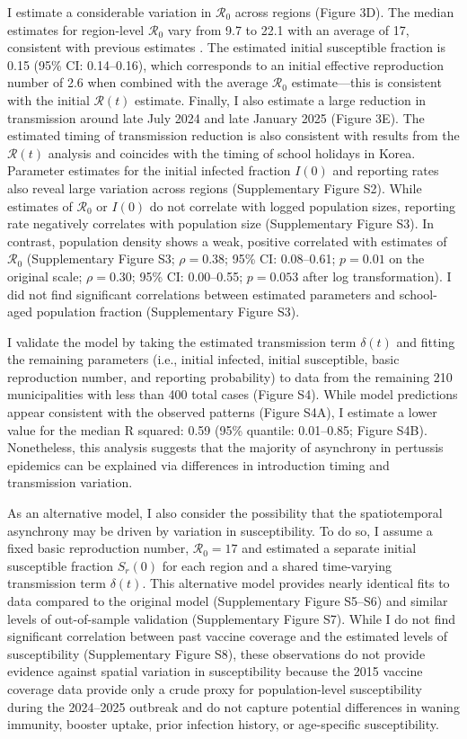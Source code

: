 \documentclass[12pt]{article}
\begin{document}
I estimate a considerable variation in $\mathcal R_0$ across regions (Figure 3D).
The median estimates for region-level $\mathcal R_0$ vary from 9.7 to 22.1 with an average of 17, consistent with previous estimates \citep{anderson1982directly,wearing2009estimating,lavine2012resolving}.
The estimated initial susceptible fraction is 0.15 (95\% CI: 0.14--0.16), which corresponds to an initial effective reproduction number of 2.6 when combined with the average $\mathcal R_0$ estimate---this is consistent with the initial $\mathcal R(t)$ estimate.
Finally, I also estimate a large reduction in transmission around late July 2024 and late January 2025 (Figure 3E).
The estimated timing of transmission reduction is also consistent with results from the $\mathcal R(t)$ analysis and coincides with the timing of school holidays in Korea.
Parameter estimates for the initial infected fraction $I(0)$ and reporting rates also reveal large variation across regions (Supplementary Figure S2).
While estimates of $\mathcal R_0$ or $I(0)$ do not correlate with logged population sizes, reporting rate negatively correlates with population size (Supplementary Figure S3).
In contrast, population density shows a weak, positive correlated with estimates of $\mathcal R_0$ (Supplementary Figure S3;
$\rho = 0.38$; 95\% CI: 0.08--0.61; $p = 0.01$ on the original scale;
$\rho = 0.30$; 95\% CI: 0.00--0.55; $p = 0.053$ after log transformation).
I did not find significant correlations between estimated parameters and school-aged population fraction (Supplementary Figure S3).

I validate the model by taking the estimated transmission term $\delta(t)$ and fitting the remaining parameters (i.e., initial infected, initial susceptible, basic reproduction number, and reporting probability) to data from the remaining 210 municipalities with less than 400 total cases (Figure S4).
While model predictions appear consistent with the observed patterns (Figure S4A),
I estimate a lower value for the median R squared: 0.59 (95\% quantile: 0.01--0.85; Figure S4B).
Nonetheless, this analysis suggests that the majority of asynchrony in pertussis epidemics can be explained via differences in introduction timing and transmission variation.

As an alternative model, I also consider the possibility that the spatiotemporal asynchrony may be driven by variation in susceptibility.
To do so, I assume a fixed basic reproduction number, $\mathcal R_0=17$ and estimated a separate initial susceptible fraction $S_r(0)$ for each region and a shared time-varying transmission term $\delta(t)$.
This alternative model provides nearly identical fits to data compared to the original model (Supplementary Figure S5--S6) and similar levels of out-of-sample validation (Supplementary Figure S7).
While I do not find significant correlation between past vaccine coverage and the estimated levels of susceptibility (Supplementary Figure S8), 
these observations do not provide evidence against spatial variation in susceptibility because the 2015 vaccine coverage data provide only a crude proxy for population-level susceptibility during the 2024--2025 outbreak and do not capture potential differences in waning immunity, booster uptake, prior infection history, or age-specific susceptibility.
\end{document}
